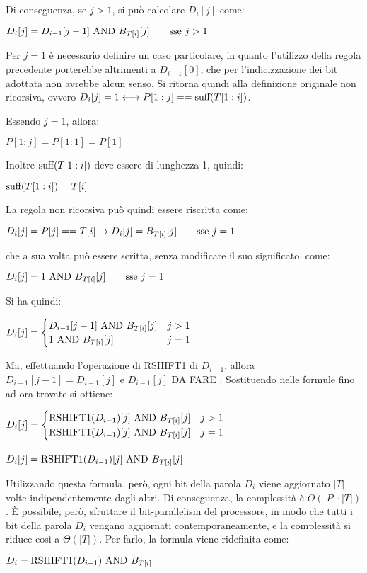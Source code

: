 Di conseguenza, se $j > 1$, si può calcolare $D_i[j]$ come:
\begin{center}
    $D_i[j] = D_{i-1}[j-1] \textnormal{ AND } B_{T[i]}[j] \quad \quad \textnormal{sse } j > 1$
\end{center}
Per $j = 1$ è necessario definire un caso particolare, in quanto l'utilizzo della regola precedente porterebbe altrimenti a $D_{i-1}[0]$, che per l'indicizzazione dei bit adottata non avrebbe alcun senso.
Si ritorna quindi alla definizione originale non ricorsiva, ovvero $D_i[j] = 1 \longleftrightarrow P[1:j] == \textnormal{suff}(T[1:i])$.

Essendo $j = 1$, allora:
\begin{center}
    $P[1:j] = P[1:1] = P[1]$
\end{center}
Inoltre $\textnormal{suff}(T[1:i])$ deve essere di lunghezza 1, quindi:
\begin{center}
    $\textnormal{suff}(T[1:i]) = T[i]$
\end{center} 
La regola non ricorsiva può quindi essere riscritta come:
\begin{center}
    $D_i[j] = P[j] == T[i] \rightarrow D_i[j] = B_{T[i]}[j] \quad \quad \textnormal{sse } j = 1$
\end{center}
che a sua volta può essere scritta, senza modificare il suo significato, come:
\begin{center}
    $D_i[j] = 1 \textnormal{ AND } B_{T[i]}[j] \quad \quad \textnormal{sse } j = 1$
\end{center}
Si ha quindi:
\begin{center}
    $D_i[j] = \begin{cases}
        D_{i-1}[j-1] \textnormal{ AND } B_{T[i]}[j] & j > 1 \\
        1 \textnormal{ AND } B_{T[i]}[j] & j = 1
    \end{cases}$
\end{center}
Ma, effettuando l'operazione di RSHIFT1 di $D_{i-1}$, allora $D_{i-1}[j-1] = D_{i-1}[j]$ e $D_{i-1}[j]$ DA FARE . Sostituendo nelle formule fino ad ora trovate si ottiene:
\begin{center}
    $D_i[j] = \begin{cases}
        \textnormal{RSHIFT1}(D_{i-1})[j] \textnormal{ AND } B_{T[i]}[j] & j > 1 \\
        \textnormal{RSHIFT1}(D_{i-1})[j] \textnormal{ AND } B_{T[i]}[j] & j = 1
    \end{cases}$\\
    \big\downarrow\\
    $D_i[j] = \textnormal{RSHIFT1}(D_{i-1})[j] \textnormal{ AND } B_{T[i]}[j]$
\end{center}
Utilizzando questa formula, però, ogni bit della parola $D_i$ viene aggiornato $|T|$ volte indipendentemente dagli altri. Di conseguenza, la complessità è $O(|P| \cdot |T|)$.
È possibile, però, sfruttare il bit-parallelism del processore, in modo che tutti i bit della parola $D_i$ vengano aggiornati contemporaneamente, e la complessità si riduce così a $\Theta(|T|)$.
Per farlo, la formula viene ridefinita come:
\begin{center}
    $D_i = \textnormal{RSHIFT1}(D_{i-1}) \textnormal{ AND } B_{T[i]}$
\end{center}

